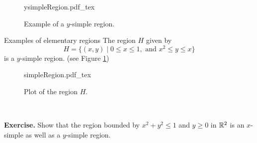 \documentclass[../Analysis-3.tex]{subfiles}
\begin{document}
\begin{figure}[H]
  \centering
  \def\svgwidth{2.3in}
  {ysimpleRegion.pdf_tex}
  \caption{Example of a $y$-simple region.}
  \label{fig1:19}
\end{figure}


\begin{Eg}{Examples of elementary regions}{}
  The region $H$ given by
  \[
    H = \{ (x,y) \mid 0 \leq x \leq 1, \mbox{ and } x^2 \leq y \leq x \}
  \]
  is a $y$-simple region. (see Figure \ref{fig1:19})
  \begin{figure}[H]
    \centering
    \def\svgwidth{2.6in}
    {simpleRegion.pdf_tex}
    \caption{Plot of the region $H$.}
    \label{fig1:S19}
  \end{figure}
\end{Eg}
\

\textbf{Exercise.} Show that the region bounded by $x^2 + y^2 \leq 1$ and $y \geq 0$ in $\mathbb{R}^2$ is an $x$-simple as well as a $y$-simple region.
\end{document}

